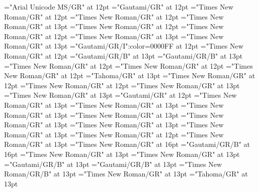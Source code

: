 \documentclass[a4paper]{article}
\begin{document}
\pagestyle{plain}
\sloppy
\setlength{\parfillskip}{0pt plus 1fil}
\font\xitemhi="Arial Unicode MS/GR" at 12pt
\font\xitemte="Gautami/GR" at 12pt
\font\xitemxitemCmPossibilitypublishStemTransTypeAbbreviationPubbefore="Times New Roman/GR" at 12pt
\font\xitemxitemcomplexformrefsbefore="Times New Roman/GR" at 12pt
\font\xitemxitemdefinitionbefore="Times New Roman/GR" at 13pt
\font\xitemxitemdefinitionLcbefore="Times New Roman/GR" at 12pt
\font\xitemxitemdefinitionLdbefore="Times New Roman/GR" at 12pt
\font\xitemxitementryrefcomponentbefore="Times New Roman/GR" at 13pt
\font\xitemxitementryreftypebefore="Times New Roman/GR" at 13pt
\font\xitemxitemexamplebefore="Gautami/GR/I":color=0000FF at 12pt
\font\xitemxitemexamplesbefore="Times New Roman/GR" at 12pt
\font\xitemxitemheadwordbefore="Gautami/GR/B" at 13pt
\font\xitemxitemLexEntrypublishStemComponentTargetHeadWordRefbefore="Gautami/GR/B" at 13pt
\font\xitemxitemLexSensepublishStemDefinitionPubbefore="Times New Roman/GR" at 12pt
\font\xitemxitemLexSensepublishStemDefinitionPubLdbefore="Times New Roman/GR" at 12pt
\font\xitemxitemprimaryrefsbefore="Times New Roman/GR" at 12pt
\font\xitemxitempronunciationbefore="Tahoma/GR" at 13pt
\font\xitemxitempronunciationsbefore="Times New Roman/GR" at 12pt
\font\xitemxitemsemanticdomainsbefore="Times New Roman/GR" at 12pt
\font\sensesensesensesbefore="Times New Roman/GR" at 13pt
\font\xitemxitemtranslationbefore="Times New Roman/GR" at 13pt
\font\xitemxitemtranslationLdbefore="Gautami/GR" at 12pt
\font\xitemxitemcrossrefbefore="Times New Roman/GR" at 13pt
\font\xitemxitemcrossreftargetsbefore="Times New Roman/GR" at 13pt
\font\xitemxitemcrossreftypebefore="Times New Roman/GR" at 13pt
\font\xitemxitemheadwordminorbefore="Times New Roman/GR" at 13pt
\font\xitemxitemmainentryrefbefore="Times New Roman/GR" at 13pt
\font\xitemxitemmainentryrefminorbefore="Times New Roman/GR" at 13pt
\font\xitemxitempronunciationminorbefore="Times New Roman/GR" at 13pt
\font\xitemxitemsensecrossrefbefore="Times New Roman/GR" at 12pt
\font\xitemxitemsensemainentryrefbefore="Times New Roman/GR" at 13pt
\font{}="Times New Roman/GR" at 16pt
\font{}="Gautami/GR/B" at 16pt
\font{}="Times New Roman/GR" at 13pt
\font\entryletDatadicBody="Times New Roman/GR" at 13pt
\font\headwordggoTeluINentryletDatadicBody="Gautami/GR/B" at 13pt
\font\headwordafterentryletDatadicBody="Gautami/GR/B" at 13pt
\font\spanenheadwordggoTeluINentryletDatadicBody="Times New Roman/GR/B" at 13pt
\font\spanentryletDatadicBody="Times New Roman/GR" at 13pt
\font\pronunciationggofonipaxemicspanentryletDatadicBody="Tahoma/GR" at 13pt
\end{document}
